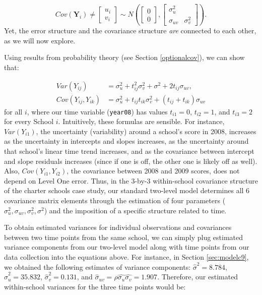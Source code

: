 \documentclass[
]{krantz}
\begin{document}
\[ Cov(\mathbf{Y}_i) \neq \left[ \begin{array}{c}
            u_{i} \\ v_{i}
          \end{array}  \right] \sim N \left( \left[
          \begin{array}{c}
            0 \\ 0
          \end{array} \right], \left[
          \begin{array}{cc}
            \sigma_{u}^{2} & \\
            \sigma_{uv} & \sigma_{v}^{2}
          \end{array} \right] \right) . \]
Yet, the error structure and the covariance structure \emph{are} connected to each other, as we will now explore.

Using results from probability theory (see Section \ref{optionalcov}), we can show that:

\begin{align*}
Var(Y_{ij}) & = \sigma_{u}^{2} + t^{2}_{ij} \sigma_{v}^{2} + \sigma^{2} + 2t_{ij}\sigma_{uv}, \\
Cov(Y_{ij},Y_{ik}) & = \sigma_{u}^{2} + t_{ij}t_{ik} \sigma_{v}^{2} + (t_{ij}+t_{ik})\sigma_{uv}
\end{align*}
for all \(i\), where our time variable (\texttt{year08}) has values \(t_{i1}=0\), \(t_{i2}=1\), and \(t_{i3}=2\) for every School \(i\). Intuitively, these formulas are sensible. For instance, \(Var(Y_{i1})\), the uncertainty (variability) around a school's score in 2008, increases as the uncertainty in intercepts and slopes increases, as the uncertainty around that school's linear time trend increases, and as the covariance between intercept and slope residuals increases (since if one is off, the other one is likely off as well). Also, \(Cov(Y_{i1},Y_{i2})\), the covariance between 2008 and 2009 scores, does not depend on Level One error. Thus, in the 3-by-3 within-school covariance structure of the charter schools case study, our standard two-level model determines all 6 covariance matrix elements through the estimation of four parameters (\(\sigma_{u}^{2}, \sigma_{uv}, \sigma_{v}^{2}, \sigma^2\)) and the imposition of a specific structure related to time.

To obtain estimated variances for individual observations and covariances between two time points from the same school, we can simply plug estimated variance components from our two-level model along with time points from our data collection into the equations above. For instance, in Section \ref{sec:modelc9}, we obtained the following estimates of variance components: \(\hat{\sigma}^{2}=8.784\), \(\hat{\sigma}^{2}_{u}=35.832\), \(\hat{\sigma}^{2}_{v}=0.131\), and \(\hat{\sigma}_{uv}=\hat{\rho}\hat{\sigma_{u}}\hat{\sigma_{v}}=1.907\). Therefore, our estimated within-school variances for the three time points would be:
\end{document}
